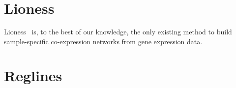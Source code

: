 \documentclass[12pt,a4paper]{article}
\begin{document}
\section{Lioness}
Lioness~\cite{kuijjer2015} is, to the best of our knowledge, the only existing method to build sample-specific co-expression networks from gene expression data.

\section{Reglines}





\end{document}
